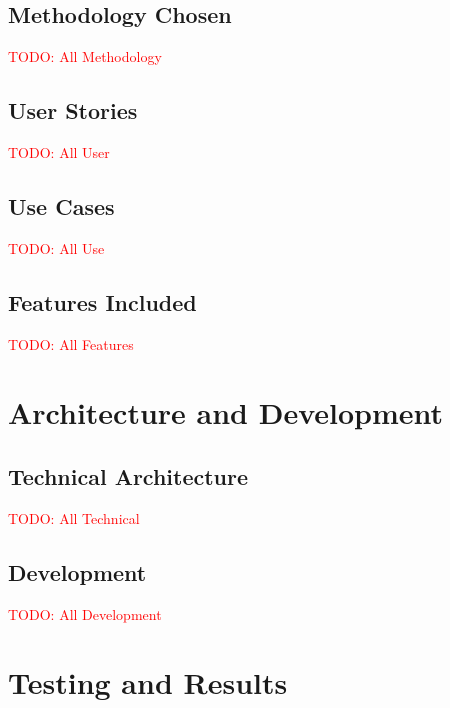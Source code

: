 \documentclass[12pt]{article}
\begin{document}
    \subsection{Methodology Chosen}
    \textcolor{red}{TODO: All Methodology}

    \subsection{User Stories}
    \textcolor{red}{TODO: All User}

    \subsection{Use Cases}
    \textcolor{red}{TODO: All Use}

    \subsection{Features Included}
    \textcolor{red}{TODO: All Features}

    
\section{Architecture and Development}
    \subsection{Technical Architecture}
    \textcolor{red}{TODO: All Technical}

    \subsection{Development}
    \textcolor{red}{TODO: All Development}


\section{Testing and Results}
\end{document}
